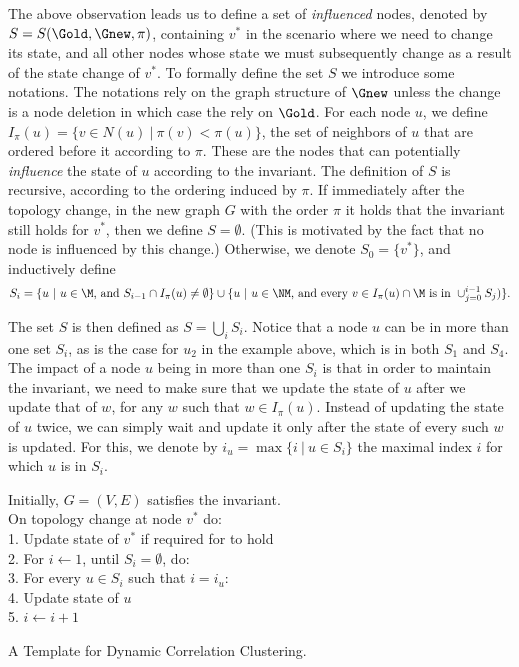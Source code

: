 The above observation leads us to define a set of \emph{influenced} nodes, denoted by $S=S(\Gold,\Gnew,\pi)$, containing $v^*$ in the scenario where we need to change its state, and all other nodes whose state we must  subsequently change as a result of the state change of $v^*$.
To formally define the set $S$ we introduce some notations. The notations rely on the graph structure of $\Gnew$ unless the change is a node deletion in which case the rely on $\Gold$.
For each node $u$, we define $I_{\pi}(u) = \{ v \in N(u) ~|~ \pi(v) <  \pi(u)\}$, the set of neighbors of $u$ that are ordered before it according to $\pi$.
These are the nodes that can potentially \emph{influence} the state of $u$ according to the \MIS invariant. The definition of $S$ is recursive, according to the ordering induced by $\pi$.
If immediately after the topology change, in the new graph $G$ with the order $\pi$ it holds that the \MIS invariant still holds for $v^*$, then we define $S=\emptyset$. (This is motivated by the fact that no node is influenced by this change.) Otherwise, we denote $S_0 = \{v^*\}$, and inductively define
\begin{equation} \label{eq:defS}
S_{i} = \{u ~|~ u \in \M \mbox{, and } S_{i-1}\cap I_{\pi}(u)\neq\emptyset\} \cup \{u ~|~ u \in \NM \mbox{, and every }  v \in I_{\pi}(u) \cap \M \mbox{ is in }\cup_{j=0}^{i-1}{S_j}) \}.
\end{equation}

The set $S$ is then defined as $S=\bigcup_i{S_i}$. Notice that a node $u$ can be in more than one set $S_i$, as is the case for $u_2$ in the example above, which is in both $S_1$ and $S_4$. The impact of a node $u$ being in more than one $S_i$ is that in order to maintain the \MIS invariant, we need to make sure that we update the state of $u$ after we update that of $w$, for any $w$ such that $w \in I_{\pi}(u)$. Instead of updating the state of $u$ twice, we can simply wait and update it only after the state of every such $w$ is updated. For this, we denote by $i_u = \max\{i~|~ u \in S_i\}$ the maximal index $i$ for which $u$ is in $S_i$.

\begin{algorithm}
Initially, $G=(V,E)$ satisfies the \MIS invariant.\\
On topology change at node $v^*$ do:\\
1. Update state of $v^*$ if required for \MIS to hold\\
2. For $i \leftarrow 1$, until $S_{i} = \emptyset$, do:\\
3. \quad For every $u \in S_{i}$ such that $i = i_u$:\\
4. \quad\quad Update state of $u$\\
5. \quad $i \leftarrow i+1$
\caption{A Template for Dynamic Correlation Clustering.}
\label{alg:template}
\end{algorithm}


